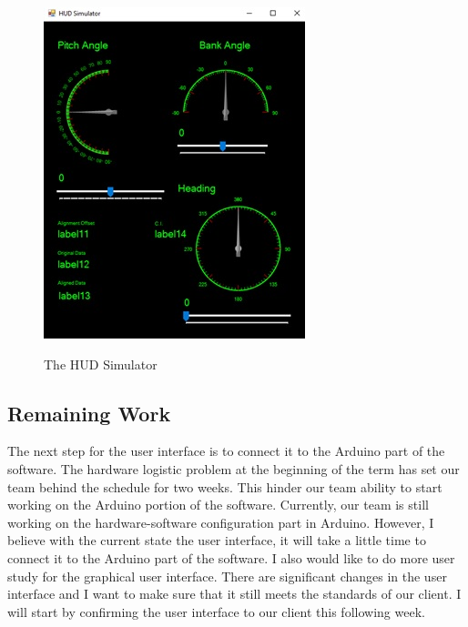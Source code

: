 \begin{figure}
	\centering
 		\caption{The HUD Simulator}
      	\includegraphics[width=\textwidth,height=\textheight,keepaspectratio]{img/hudsim}
    \label{fig:hudsim}
\end{figure}

\subsection{Remaining Work}
The next step for the user interface is to connect it to the Arduino part of the software. The hardware logistic problem at the beginning of the term has set our team behind the schedule for two weeks. This hinder our team ability to start working on the Arduino portion of the software. Currently, our team is still working on the hardware-software configuration part in Arduino. However, I believe with the current state the user interface, it will take a little time to connect it to the Arduino part of the software. I also would like to do more user study for the graphical user interface. There are significant changes in the user interface and I want to make sure that it still meets the standards of our client. I will start by confirming the user interface to our client this following week.

